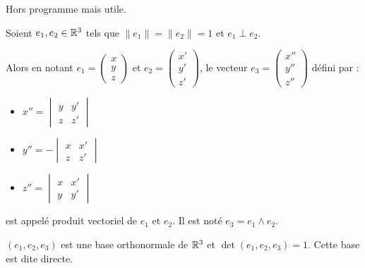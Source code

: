 
\lvspace
\avspace 

\begin{exemple}
    Hors programme mais utile. 

    Soient $e_1, e_2 \in \mathbb{R}^3$ tels que $\|e_1\| = \|e_2\| = 1$ et $e_1 \perp e_2$. 

    Alors en notant $e_1 = \begin{pmatrix}
        x \\ y \\ z
    \end{pmatrix}$ et $e_2 = \begin{pmatrix}
        x' \\ y' \\ z'
        \end{pmatrix}$, le vecteur $e_3 = \begin{pmatrix}
            x'' \\ y'' \\ z''
        \end{pmatrix}$ défini par : 
    \begin{itemize}
        \item $x'' = \begin{vmatrix}
            y & y' \\ z & z'
        \end{vmatrix}$
        \item $y'' = - \begin{vmatrix}
            x & x' \\ z & z'
        \end{vmatrix}$
        \item $z'' = \begin{vmatrix}
            x & x' \\ y & y'
        \end{vmatrix}$
    \end{itemize}

    est appelé produit vectoriel de $e_1$ et $e_2$. Il est noté $e_3 = e_1 \wedge e_2$.

    $(e_1, e_2, e_3)$ est une base orthonormale de $\mathbb{R}^3$ et $\det (e_1, e_2, e_3) = 1$. 
    Cette base est dite directe.
\end{exemple}

